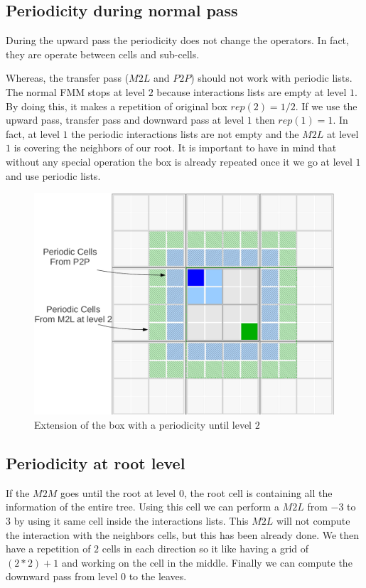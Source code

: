 \documentclass[12pt]{article} %
\begin{document}
\subsection{Periodicity during normal pass}
During the upward pass the periodicity does not change the operators.
In fact, they are operate between cells and sub-cells.

Whereas, the transfer pass ($M2L$ and $P2P$) should not work with periodic lists.
The normal FMM stops at level $2$ because interactions lists are empty at level $1$.
By doing this, it makes a repetition of original box $rep(2) = 1/2$.
If we use the upward pass, transfer pass and downward pass at level $1$ then $rep(1) = 1$.
In fact, at level $1$ the periodic interactions lists are not empty and the $M2L$ at level $1$ is covering the neighbors of our root.
It is important to have in mind that without any special operation the box is already repeated once it we go at level $1$ and use periodic lists.

\begin{figure}[h]
\centering
\includegraphics[scale=0.35]{Images/PeriodicL2}
\caption{Extension of the box with a periodicity until level $2$}
\end{figure}

\subsection{Periodicity at root level}
If the $M2M$ goes until the root at level $0$, the root cell is containing all the information of the entire tree.
Using this cell we can perform a $M2L$ from $-3$ to $3$ by using it same cell inside the interactions lists.
This $M2L$ will not compute the interaction with the neighbors cells, but this has been already done.
We then have a repetition of $2$ cells in each direction so it like having a grid of $(2*2)+1$ and working on the cell in the middle.
Finally we can compute the downward pass from level $0$ to the leaves.
\end{document}
